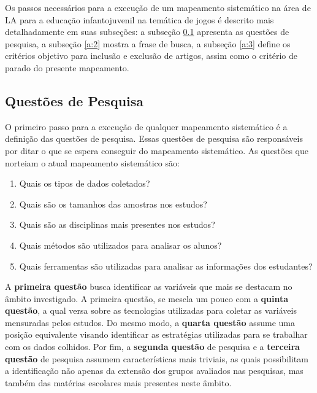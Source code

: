 \documentclass[12pt]{article}
\begin{document}
Os passos necessários para a execução de um mapeamento sistemático na área de LA para a educação infantojuvenil na temática de jogos é descrito mais detalhadamente em suas subseções: a subseção \ref{a:1} apresenta as questões de pesquisa, a subseção \ref{a:2} mostra a frase de busca, a subseção \ref{a:3} define os critérios objetivo para inclusão e exclusão de artigos, assim como o critério de parado do presente mapeamento.


\vspace{-0.1cm}

\subsection{Questões de Pesquisa}\label{a:1}

\vspace{-0.1cm}

O primeiro passo para a execução de qualquer mapeamento sistemático é a definição das questões de pesquisa. Essas questões de pesquisa são responsáveis por ditar o que se espera conseguir do mapeamento sistemático. As questões que norteiam o atual mapeamento sistemático são:

\vspace{-0.1cm}

\begin{enumerate}
    \item Quais os tipos de dados coletados?
    \item Quais são os tamanhos das amostras nos estudos?
    \item Quais são as disciplinas mais presentes nos estudos?
    \item Quais métodos são utilizados para analisar os alunos?
    \item Quais ferramentas são utilizadas para analisar as informações dos estudantes?
\end{enumerate}

\vspace{-0.1cm}

A \textbf{primeira questão} busca identificar as variáveis que mais se destacam no âmbito investigado. A primeira questão, se mescla um pouco com a \textbf{quinta questão}, a qual versa sobre as tecnologias utilizadas para coletar as variáveis mensuradas pelos estudos. Do mesmo modo, a \textbf{quarta questão} assume uma posição equivalente visando identificar as estratégias utilizadas para se trabalhar com os dados colhidos. Por fim, a \textbf{segunda questão} de pesquisa e a \textbf{terceira questão} de pesquisa assumem características mais triviais, as quais possibilitam a identificação não apenas da extensão dos grupos avaliados nas pesquisas, mas também das matérias escolares mais presentes neste âmbito. 
\end{document}
